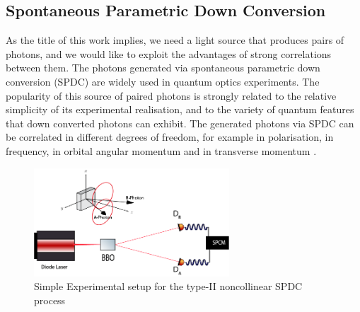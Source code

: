 
\subsection{Spontaneous Parametric Down Conversion}

As the title of this work implies, we need a light source that produces pairs of photons, 
and we would like to exploit the advantages of strong correlations between them.
The photons generated via spontaneous parametric down conversion (SPDC) are
widely used in quantum optics experiments. The popularity of this source of paired
photons is strongly related to the relative simplicity of its experimental
realisation, and to the variety of quantum features that down converted photons can exhibit. 
The generated photons via SPDC can be correlated in different degrees of freedom, for example 
in polarisation, in frequency, in orbital angular momentum and in transverse momentum \cite{spatiocorrelations}.\\

\begin{figure}[h!]
\centering
 \includegraphics[width=0.65\textwidth]{Figures/spdcSimple.png}
 \caption{Simple Experimental setup for the type-II noncollinear SPDC process}
\label{fig:spdcSimple} 
\end{figure}


